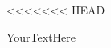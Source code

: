 \documentclass[preview]{standalone}
\begin{document}
<<<<<<< HEAD
\begin{CJK}{UTF8}{gkai}
YourTextHere
\end{CJK}
\end{document}
